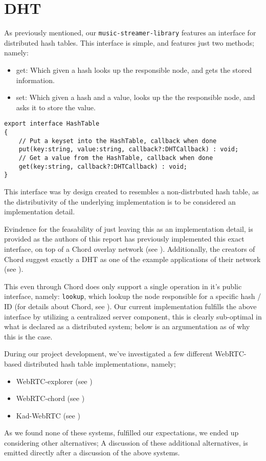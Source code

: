\section{DHT}
\label{sec:dht}

As previously mentioned, our \verb|music-streamer-library| features an
interface for distributed hash tables. This interface is simple, and features
just two methods; namely:
\begin{itemize}
    \item get: Which given a hash looks up the responsible node, and gets the 
        stored information.
    \item set: Which given a hash and a value, looks up the the responsible
        node, and asks it to store the value.
\end{itemize}
\begin{lstlisting}[caption={TypeScript DHT HashTable interface}]
export interface HashTable
{
    // Put a keyset into the HashTable, callback when done
    put(key:string, value:string, callback?:DHTCallback) : void;
    // Get a value from the HashTable, callback when done
    get(key:string, callback?:DHTCallback) : void;
}
\end{lstlisting}
This interface was by design created to resembles a non-distrbuted hash table,
as the distributivity of the underlying implementation is to be considered an 
implementation detail.

Evindence for the feasability of just leaving this as an implementation detail,
is provided as the authors of this report has previously implemented this exact
interface, on top of a Chord overlay network (see \citep{Skeen:Chord}).
Additionally, the creators of Chord suggest exactly a \acs{DHT} as one of the example
applications of their network (see \citep{Brunskill:Chord}).

This even through Chord does only support a single operation in it's public 
interface, namely: \verb|lookup|, which lookup the node responsible for a
specific hash / ID (for details about Chord, see \citep{Stoica:Chord}).
\newline\newline
Our current implementation fulfills the above interface by utilizing a
centralized server component, this is clearly sub-optimal in what is declared
as a distributed system; below is an argumentation as of why this is the case.

During our project development, we've investigated a few different WebRTC-based
distributed hash table implementations, namely;
\begin{itemize}
    \item WebRTC-explorer (see \citep{diasdavid:webrtc-explorer})
    \item WebRTC-chord (see \citep{diasdavid:webrtc-chord})
    \item Kad-WebRTC (see \citep{kadtools:kad-webrtc})
\end{itemize}
As we found none of these systems, fulfilled our expectations, we ended up 
considering other alternatives; A discussion of these additional alternatives,
is emitted directly after a discussion of the above systems.

